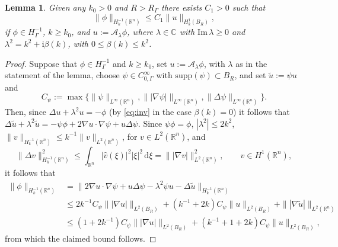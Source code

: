 \documentclass{birkjour}
\newtheorem{lemma}[theorem]{Lemma}
\theoremstyle{definition}
\theoremstyle{remark}
\numberwithin{equation}{section}
\newcommand{\R}{\mathbb{R}}
\newcommand{\C}{\mathbb{C}}
\newcommand{\ri}{\mathrm{i}}
\newcommand{\cA}{\mathcal{A}}
\newcommand{\supp}{\mathrm{supp}}
\newcommand{\rd}{\mathrm{d}}
\begin{document}
\begin{lemma} \label{lem:step1} Given any $k_0>0$ and $R>R_\Gamma$ there exists $C_1>0$ such that
$$
\|\phi\|_{H_k^{-1}(\R^n)} \leq C_1 \|u\|_{H^1_k(B_R)},
$$
if $\phi\in H^{-1}_\Gamma$, $k\geq k_0$, and $u:= \cA_\lambda \phi$, where $\lambda\in \C$ with $\mathrm{Im}\,\lambda \geq 0$ and $\lambda^2=k^2+\ri \beta(k)$, with $0\leq \beta(k)\leq k^2$. 
\end{lemma}
\begin{proof} Suppose that $\phi\in H^{-1}_\Gamma$ and $k\geq k_0$, set $u:= \cA_\lambda \phi$, with $\lambda$ as in the statement of the lemma, choose $\psi\in C_{0,\Gamma}^\infty$ with $\supp(\psi)\subset B_R$, and set $\tilde u := \psi u$ and 
\begin{equation} \label{eq:psi}
C_\psi := \max\{\|\psi\|_{L^\infty(\R^n)},\| |\nabla\psi| \|_{L^\infty(\R^n)},\|\Delta \psi\|_{L^\infty(\R^n)}\}.
\end{equation}
Then, since $\Delta u + \lambda^2 u = -\phi$ (by \eqref{eq:inv} in the case $\beta(k)=0$) it follows that $\Delta \tilde u + \lambda^2 \tilde u = -\psi\phi + 2\nabla u \cdot \nabla \psi + u\Delta \psi$. Since $\psi\phi=\phi$, $|\lambda^2| \leq 2k^2$, $\|v\|_{H_k^{-1}(\R^n)}\leq k^{-1}\|v\|_{L^2(\R^n)}$, for $v\in L^2(\R^n)$, and 
$$
\|\Delta v\|^2_{H_k^{-1}(\R^n)}\leq \int_{\R^n} |\hat v(\xi)|^2|\xi|^2\, \rd \xi = \| |\nabla v| \|^2_{L^2(\R^n)}, \qquad v\in H^1(\R^n), 
$$
it follows that
\begin{align*}
\|\phi\|_{H_k^{-1}(\R^n)} &= \|2\nabla u\cdot \nabla \psi + u\Delta \psi -\lambda^2\psi u-\Delta \tilde u\|_{H^{-1}_k(\R^n)}\\
& \leq  2k^{-1} C_\psi \| |\nabla u| \|_{L^2(B_R)} + (k^{-1} +2k)C_\psi \|u\|_{L^2(B_R)} + \| |\nabla \tilde u| \|_{L^2(\R^n)}\\
& \leq  (1+2k^{-1}) C_\psi \| |\nabla u| \|_{L^2(B_R)} + (k^{-1} +1 + 2k)C_\psi \|u\|_{L^2(B_R)},
\end{align*}
from which the claimed bound follows.
\end{proof}
\end{document}
